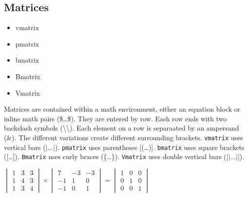        \subsection{Matrices}
        \label{Matrices}
        
        \begin{framed}
            \begin{itemize}
                \item{vmatrix}
                \item{pmatrix}
                \item{bmatrix}
                \item{Bmatrix}
                \item{Vmatrix}
            \end{itemize}
        \end{framed}

        Matrices are contained within a math environment, either an equation block or inline math pairs (\$\ldots\$). They are entered by row. Each row ends with two backslash symbols (\textbackslash\textbackslash). Each element on a row is separaated by an ampersand (\&). The different variations create different surrounding brackets.
        \texttt{vmatrix} uses vertical bars ($|\ldots|$).
        \texttt{pmatrix} uses parentheses [(\ldots)].
        \texttt{bmatrix} uses square brackets ([\ldots]).
        \texttt{Bmatrix} uses curly braces (\{\ldots\}).
        \texttt{Vmatrix} uses double vertical bars ($||\ldots||$).

        $ \begin{vmatrix}
            1 & 3 & 3 \\
            1 & 4 & 3 \\
            1 & 3 & 4 
        \end{vmatrix}
         \times 
         \begin{vmatrix}
             7 & -3 & -3 \\
             -1 & 1 & 0 \\
             -1 & 0 & 1
         \end{vmatrix}
         =
         \begin{vmatrix}
             1 & 0 & 0 \\
             0 & 1 & 0 \\
             0 & 0 & 1
         \end{vmatrix} $

